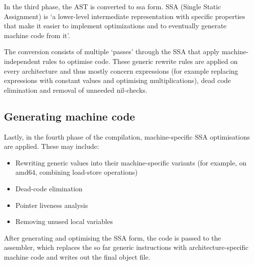 In the third phase, the AST is converted to \gls{ssa} form. SSA (Single Static Assignment) is `a
lower-level intermediate representation with specific properties that make it
easier to implement optimizations and to eventually generate machine code from
it'\autocite{compiler-readme}.

The conversion consists of multiple `passes' through the SSA that
apply machine-independent rules to optimise code. These generic
rewrite rules are applied on every architecture and thus mostly
concern expressions (for example replacing expressions with constant values and
optimising multiplications), dead code elimination and removal of unneeded
nil-checks.

\subsection{Generating machine code}

Lastly, in the fourth phase of the compilation, machine-specific
SSA optimisations are applied. These may include:
\begin{itemize}
    \item Rewriting generic values into their machine-specific variants
        (for example, on amd64, combining load-store operations)
    \item Dead-code elimination
    \item Pointer liveness analysis
    \item Removing unused local variables
\end{itemize}

After generating and optimising the SSA form, the code is passed to the
assembler, which replaces the so far generic instructions with
architecture-specific machine code and writes out the final object file\autocite{compiler-readme}.
